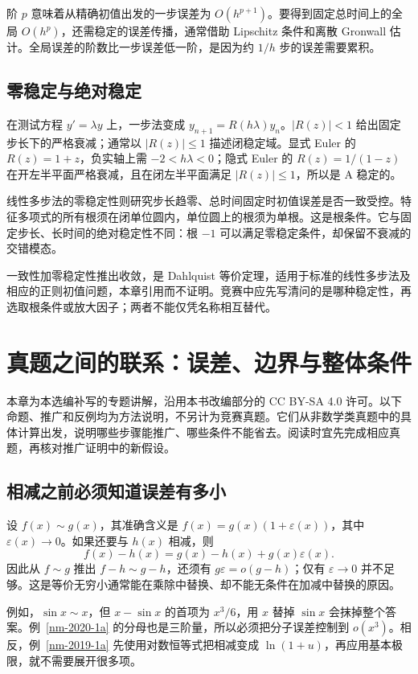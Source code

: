 \documentclass[UTF8,12pt,a4paper,fontset=fandol]{ctexart}
\begin{document}
阶 $p$ 意味着从精确初值出发的一步误差为 $O(h^{p+1})$。要得到固定总时间上的全局 $O(h^p)$，还需稳定的误差传播，通常借助 Lipschitz 条件和离散 Gronwall 估计。全局误差的阶数比一步误差低一阶，是因为约 $1/h$ 步的误差需要累积。

\subsection{零稳定与绝对稳定}

\label{app:dynamics-stability}

在测试方程 $y'=\lambda y$ 上，一步法变成 $y_{n+1}=R(h\lambda)y_n$。$|R(z)|<1$ 给出固定步长下的严格衰减；通常以 $|R(z)|\leq1$ 描述闭稳定域。显式 Euler 的 $R(z)=1+z$，负实轴上需 $-2<h\lambda<0$；隐式 Euler 的 $R(z)=1/(1-z)$ 在开左半平面严格衰减，且在闭左半平面满足 $|R(z)|\leq1$，所以是 A 稳定的。

线性多步法的零稳定性则研究步长趋零、总时间固定时初值误差是否一致受控。特征多项式的所有根须在闭单位圆内，单位圆上的根须为单根。这是根条件。它与固定步长、长时间的绝对稳定性不同：根 $-1$ 可以满足零稳定条件，却保留不衰减的交错模态。

一致性加零稳定性推出收敛，是 Dahlquist 等价定理，适用于标准的线性多步法及相应的正则初值问题，本章引用而不证明。竞赛中应先写清问的是哪种稳定性，再选取根条件或放大因子；两者不能仅凭名称相互替代。

\section{真题之间的联系：误差、边界与整体条件}\label{sec:supp-audit}
本章为本选编补写的专题讲解，沿用本书改编部分的 CC BY-SA 4.0 许可。以下命题、推广和反例均为方法说明，不另计为竞赛真题。它们从非数学类真题中的具体计算出发，说明哪些步骤能推广、哪些条件不能省去。阅读时宜先完成相应真题，再核对推广证明中的新假设。

\subsection{相减之前必须知道误差有多小}
设 $f(x)\sim g(x)$，其准确含义是 $f(x)=g(x)(1+\varepsilon(x))$，其中 $\varepsilon(x)\to0$。如果还要与 $h(x)$ 相减，则
\[
 f(x)-h(x)=g(x)-h(x)+g(x)\varepsilon(x).
\]
因此从 $f\sim g$ 推出 $f-h\sim g-h$，还须有 $g\varepsilon=o(g-h)$；仅有 $\varepsilon\to0$ 并不足够。这是等价无穷小通常能在乘除中替换、却不能无条件在加减中替换的原因。

例如，$\sin x\sim x$，但 $x-\sin x$ 的首项为 $x^3/6$，用 $x$ 替掉 $\sin x$ 会抹掉整个答案。例~\ref{nm-2020-1a} 的分母也是三阶量，所以必须把分子误差控制到 $o(x^3)$。相反，例~\ref{nm-2019-1a} 先使用对数恒等式把相减变成 $\ln(1+u)$，再应用基本极限，就不需要展开很多项。
\end{document}
